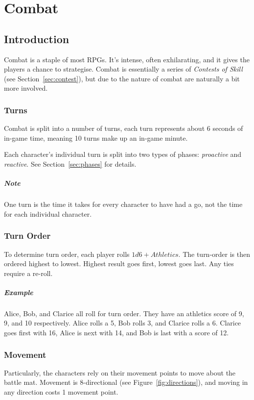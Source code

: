\chapter{Combat}\label{chap:combat}
\section{Introduction}
Combat is a staple of most RPGs. 
It's intense, often exhilarating, and it gives the players a chance to strategise.
Combat is essentially a series of \textit{Contests of Skill} (see Section~\ref{sec:contest}), but due to the nature of combat are naturally a bit more involved.

\subsection{Turns}
Combat is split into a number of turns, each turn represents about 6 seconds of in-game time, meaning 10 turns make up an in-game minute.

Each character's individual turn is split into two types of phases: \textit{proactive} and \textit{reactive}.
See Section~\ref{sec:phases} for details.

\paragraph{Note} One turn is the time it takes for every character to have had a go, not the time for each individual character.

\subsection{Turn Order}
To determine turn order, each player rolls $1d6 + \mathit{Athletics}$. 
The turn-order is then ordered highest to lowest. 
Highest result goes first, lowest goes last. 
Any ties require a re-roll.

\paragraph{Example} Alice, Bob, and Clarice all roll for turn order. 
They have an athletics score of 9, 9, and 10 respectively. 
Alice rolls a 5, Bob rolls 3, and Clarice rolls a 6. 
Clarice goes first with 16, Alice is next with 14, and Bob is last with a score of 12.

\subsection{Movement}\label{sec:movement}
Particularly, the characters rely on their movement points to move about the battle mat.
Movement is 8-directional (see Figure~\ref{fig:directions}), and moving in any direction costs 1 movement point.


